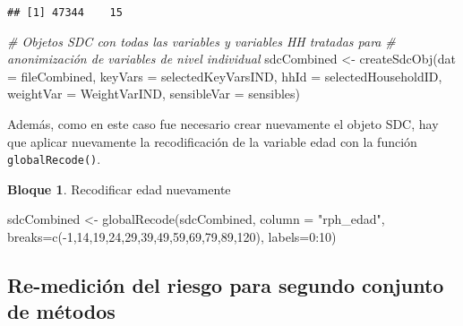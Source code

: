 \documentclass[
]{book}
\newenvironment{Shaded}{\begin{snugshade}}{\end{snugshade}}
\newcommand{\AttributeTok}[1]{\textcolor[rgb]{0.77,0.63,0.00}{#1}}
\newcommand{\CommentTok}[1]{\textcolor[rgb]{0.56,0.35,0.01}{\textit{#1}}}
\newcommand{\DecValTok}[1]{\textcolor[rgb]{0.00,0.00,0.81}{#1}}
\newcommand{\FunctionTok}[1]{\textcolor[rgb]{0.00,0.00,0.00}{#1}}
\newcommand{\NormalTok}[1]{#1}
\newcommand{\OtherTok}[1]{\textcolor[rgb]{0.56,0.35,0.01}{#1}}
\newcommand{\SpecialCharTok}[1]{\textcolor[rgb]{0.00,0.00,0.00}{#1}}
\newcommand{\StringTok}[1]{\textcolor[rgb]{0.31,0.60,0.02}{#1}}
\theoremstyle{definition}
\theoremstyle{definition}
\newtheorem{example}{Bloque}[chapter]
\theoremstyle{definition}
\theoremstyle{definition}
\theoremstyle{remark}
\begin{document}
\begin{verbatim}
## [1] 47344    15
\end{verbatim}

\begin{Shaded}
\begin{Highlighting}[]
\CommentTok{\# Objetos SDC con todas las variables y variables HH tratadas para}
\CommentTok{\# anonimización de variables de nivel individual}
\NormalTok{sdcCombined }\OtherTok{\textless{}{-}} \FunctionTok{createSdcObj}\NormalTok{(}\AttributeTok{dat =}\NormalTok{ fileCombined, }\AttributeTok{keyVars =}\NormalTok{ selectedKeyVarsIND,}
                            \AttributeTok{hhId =}\NormalTok{ selectedHouseholdID, }\AttributeTok{weightVar =}\NormalTok{ WeightVarIND,}
                            \AttributeTok{sensibleVar =}\NormalTok{ sensibles)}
\end{Highlighting}
\end{Shaded}

Además, como en este caso fue necesario crear nuevamente el objeto SDC, hay que aplicar nuevamente la recodificación de la variable edad con la función \texttt{globalRecode()}.

\begin{example}
\protect\hypertarget{exm:bloque59nbm}{}\label{exm:bloque59nbm}Recodificar edad nuevamente
\end{example}

\begin{Shaded}
\begin{Highlighting}[]
\NormalTok{sdcCombined }\OtherTok{\textless{}{-}} \FunctionTok{globalRecode}\NormalTok{(sdcCombined,}
                            \AttributeTok{column =} \StringTok{"rph\_edad"}\NormalTok{,}
                            \AttributeTok{breaks=}\FunctionTok{c}\NormalTok{(}\SpecialCharTok{{-}}\DecValTok{1}\NormalTok{,}\DecValTok{14}\NormalTok{,}\DecValTok{19}\NormalTok{,}\DecValTok{24}\NormalTok{,}\DecValTok{29}\NormalTok{,}\DecValTok{39}\NormalTok{,}\DecValTok{49}\NormalTok{,}\DecValTok{59}\NormalTok{,}\DecValTok{69}\NormalTok{,}\DecValTok{79}\NormalTok{,}\DecValTok{89}\NormalTok{,}\DecValTok{120}\NormalTok{),}
                            \AttributeTok{labels=}\DecValTok{0}\SpecialCharTok{:}\DecValTok{10}\NormalTok{)}
\end{Highlighting}
\end{Shaded}

\hypertarget{re-mediciuxf3n-del-riesgo-para-segundo-conjunto-de-muxe9todos}{%
\subsection{Re-medición del riesgo para segundo conjunto de métodos}\label{re-mediciuxf3n-del-riesgo-para-segundo-conjunto-de-muxe9todos}}
\end{document}
